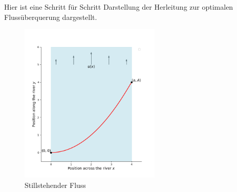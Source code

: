 











Hier ist eine Schritt für Schritt Darstellung der Herleitung zur optimalen Flussüberquerung dargestellt. 

\begin{figure}
    \centering
        \centering
        \includegraphics[width=0.6\textwidth]{papers/schwimmen/Grafiken/Figure_1.png}	
        \caption{Stillstehender Fluss}
        \label{fig:river_template}
\end{figure}


